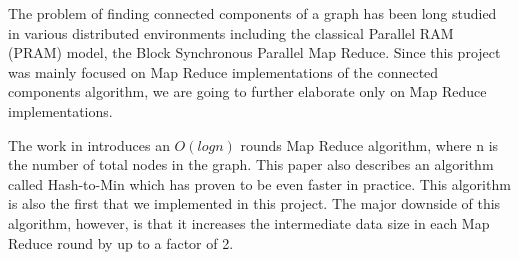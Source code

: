 The problem of finding connected components of a graph has been long studied in various distributed environments including the classical Parallel RAM (PRAM) model, the Block Synchronous Parallel Map Reduce. Since this project was mainly focused on Map Reduce implementations of the connected components algorithm, we are going to further elaborate only on Map Reduce implementations.

The work in \cite{rastogi} introduces an $O(logn)$ rounds Map Reduce algorithm, where n is the number of total nodes in the graph. This paper also describes an algorithm called Hash-to-Min which has proven to be even faster in practice. This algorithm is also the first that we implemented in this project. The major downside of this algorithm, however, is that it increases the intermediate data size in each Map Reduce round by up to a factor of 2.

\cite{kiveris}